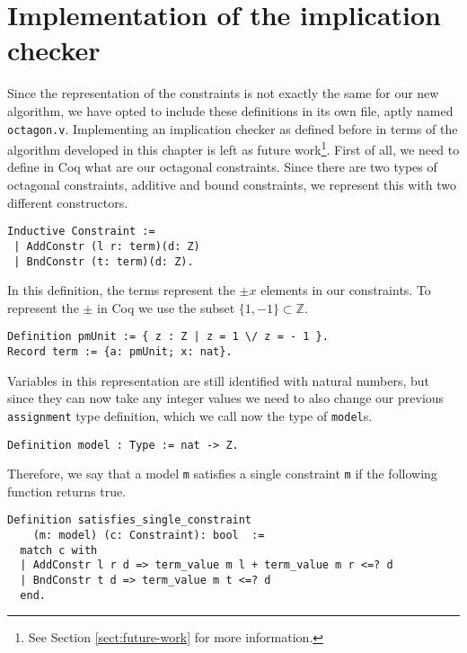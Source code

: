 \section{Implementation of the implication checker}

Since the representation of the constraints is not exactly the same for our new 
algorithm, we have opted to include these definitions in its own file, aptly named
\verb|octagon.v|. Implementing an implication checker as defined before in terms of
the algorithm developed in this chapter is left as future work\footnote{See Section 
\ref{sect:future-work} for more information.}. First of all, we need to define in Coq 
what are our octagonal constraints. Since there are two types of octagonal constraints,
additive and bound constraints, we represent this with two different constructors.

\begin{verbatim}
Inductive Constraint :=
 | AddConstr (l r: term)(d: Z)
 | BndConstr (t: term)(d: Z).
\end{verbatim}

In this definition, the terms represent the $\pm x$ elements in our constraints. To
represent the $\pm$ in Coq we use the subset $\{1,-1\} \subset \mathbb{Z}$.

\begin{verbatim}
Definition pmUnit := { z : Z | z = 1 \/ z = - 1 }.
Record term := {a: pmUnit; x: nat}.
\end{verbatim}

Variables in this representation are still identified with natural numbers, but since
they can now take any integer values we need to also change our previous \texttt{assignment}
type definition, which we call now the type of \texttt{model}s.

\begin{verbatim}
Definition model : Type := nat -> Z.
\end{verbatim}

Therefore, we say that a model \texttt{m} satisfies a single constraint \texttt{m}
if the following function returns true.

\begin{verbatim}
Definition satisfies_single_constraint 
    (m: model) (c: Constraint): bool  := 
  match c with 
  | AddConstr l r d => term_value m l + term_value m r <=? d
  | BndConstr t d => term_value m t <=? d
  end.
\end{verbatim}

